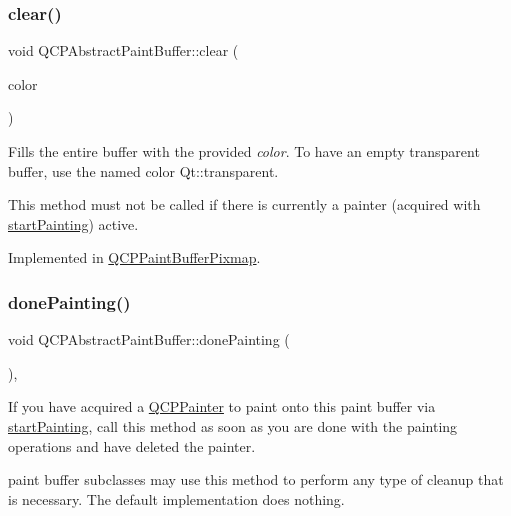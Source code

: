 \subsubsection{\texorpdfstring{clear()}{clear()}}
{\footnotesize\ttfamily void Q\+C\+P\+Abstract\+Paint\+Buffer\+::clear (\begin{DoxyParamCaption}\item[{const Q\+Color \&}]{color }\end{DoxyParamCaption})\hspace{0.3cm}{\ttfamily [pure virtual]}}

Fills the entire buffer with the provided {\itshape color}. To have an empty transparent buffer, use the named color {\ttfamily Qt\+::transparent}.

This method must not be called if there is currently a painter (acquired with \hyperlink{class_q_c_p_abstract_paint_buffer_a9e9f29b19c033cf02fb96f1a148463f3}{start\+Painting}) active. 

Implemented in \hyperlink{class_q_c_p_paint_buffer_pixmap_a14badbd010a3cde6b55817ccb7b65217}{Q\+C\+P\+Paint\+Buffer\+Pixmap}.

\mbox{\label{class_q_c_p_abstract_paint_buffer_a41b0dc6e7744f19fae09f8532c207dc1}} 
\subsubsection{\texorpdfstring{done\+Painting()}{donePainting()}}
{\footnotesize\ttfamily void Q\+C\+P\+Abstract\+Paint\+Buffer\+::done\+Painting (\begin{DoxyParamCaption}{ }\end{DoxyParamCaption})\hspace{0.3cm}{\ttfamily [inline]}, {\ttfamily [virtual]}}

If you have acquired a \hyperlink{class_q_c_p_painter}{Q\+C\+P\+Painter} to paint onto this paint buffer via \hyperlink{class_q_c_p_abstract_paint_buffer_a9e9f29b19c033cf02fb96f1a148463f3}{start\+Painting}, call this method as soon as you are done with the painting operations and have deleted the painter.

paint buffer subclasses may use this method to perform any type of cleanup that is necessary. The default implementation does nothing. \mbox{\label{class_q_c_p_abstract_paint_buffer_afb998c7525e3ae37d9d2d46c7aaf461a}} 

